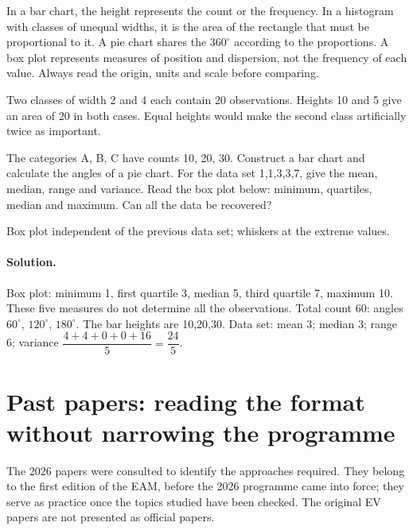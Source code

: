 In a bar chart, the height represents the count or the frequency. In a histogram with classes of unequal widths, it is the area of the rectangle that must be proportional to it. A pie chart shares the $360^\circ$ according to the proportions. A box plot represents measures of position and dispersion, not the frequency of each value. Always read the origin, units and scale before comparing.
\begin{example}Two classes of width 2 and 4 each contain 20 observations. Heights 10 and 5 give an area of 20 in both cases. Equal heights would make the second class artificially twice as important.\end{example}
\begin{application}The categories A, B, C have counts 10, 20, 30. Construct a bar chart and calculate the angles of a pie chart. For the data set 1,1,3,3,7, give the mean, median, range and variance. Read the box plot below: minimum, quartiles, median and maximum. Can all the data be recovered?\end{application}\label{STATS-EX}
\begin{center}\par\small Box plot independent of the previous data set; whiskers at the extreme values.\end{center}
\ifmxteacher
\paragraph{Solution.} Box plot: minimum 1, first quartile 3, median 5, third quartile 7, maximum 10. These five measures do not determine all the observations. Total count 60: angles $60^\circ$, $120^\circ$, $180^\circ$. The bar heights are 10,20,30. Data set: mean 3; median 3; range 6; variance $\dfrac{4+4+0+0+16}{5}=\dfrac{24}{5}$.
\fi

\section{Past papers: reading the format without narrowing the programme}\label{ANNALES}
The 2026 papers were consulted to identify the approaches required. They belong to the first edition of the EAM, before the 2026 programme came into force; they serve as practice once the topics studied have been checked. The original EV papers are not presented as official papers.

